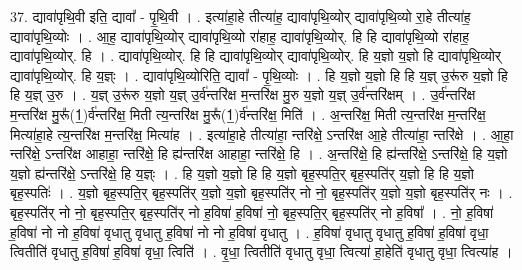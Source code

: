 \documentclass[17pt]{extarticle}
\begin{document}
37. द्यावा॑पृथि॒वी इति॒ द्यावा᳚ - पृ॒थि॒वी । . इत्या॑हा॒हे तीत्या॑ह॒ द्यावा॑पृथि॒व्योर् द्यावा॑पृथि॒व्यो रा॒हे तीत्या॑ह॒ द्यावा॑पृथि॒व्योः । . आ॒ह॒ द्यावा॑पृथि॒व्योर् द्यावा॑पृथि॒व्यो रा॑हाह॒ द्यावा॑पृथि॒व्योर्. हि हि द्यावा॑पृथि॒व्यो रा॑हाह॒ द्यावा॑पृथि॒व्योर्. हि । . द्यावा॑पृथि॒व्योर्. हि हि द्यावा॑पृथि॒व्योर् द्यावा॑पृथि॒व्योर्. हि य॒ज्ञो य॒ज्ञो हि द्यावा॑पृथि॒व्योर् द्यावा॑पृथि॒व्योर्. हि य॒ज्ञ्ः । . द्यावा॑पृथि॒व्योरिति॒ द्यावा᳚ - पृ॒थि॒व्योः । . हि य॒ज्ञो य॒ज्ञो हि हि य॒ज्ञ् उ॒रू॑रु य॒ज्ञो हि हि य॒ज्ञ् उ॒रु । . य॒ज्ञ् उ॒रू॑रु य॒ज्ञो य॒ज्ञ् उ॒र्व॑न्तरि॑क्ष म॒न्तरि॑क्ष मु॒रु य॒ज्ञो य॒ज्ञ् उ॒र्व॑न्तरि॑क्षम् । . उ॒र्व॑न्तरि॑क्ष म॒न्तरि॑क्ष मु॒रू᳚(1॒)र्व॑न्तरि॑क्ष॒ मिती त्य॒न्तरि॑क्ष मु॒रू᳚(1॒)र्व॑न्तरि॑क्ष॒ मिति॑ । . अ॒न्तरि॑क्ष॒ मिती त्य॒न्तरि॑क्ष म॒न्तरि॑क्ष॒ मित्या॑हा॒हे त्य॒न्तरि॑क्ष म॒न्तरि॑क्ष॒ मित्या॑ह । . इत्या॑हा॒हे तीत्या॑हा॒ न्तरि॑क्षे॒ ऽन्तरि॑क्ष आ॒हे तीत्या॑हा॒ न्तरि॑क्षे । . आ॒हा॒ न्तरि॑क्षे॒ ऽन्तरि॑क्ष आहाहा॒ न्तरि॑क्षे॒ हि ह्य॑न्तरि॑क्ष आहाहा॒ न्तरि॑क्षे॒ हि । . अ॒न्तरि॑क्षे॒ हि ह्य॑न्तरि॑क्षे॒ ऽन्तरि॑क्षे॒ हि य॒ज्ञो य॒ज्ञो ह्य॑न्तरि॑क्षे॒ ऽन्तरि॑क्षे॒ हि य॒ज्ञ्ः । . हि य॒ज्ञो य॒ज्ञो हि हि य॒ज्ञो बृह॒स्पति॒र् बृह॒स्पति॑र् य॒ज्ञो हि हि य॒ज्ञो बृह॒स्पतिः॑ । . य॒ज्ञो बृह॒स्पति॒र् बृह॒स्पति॑र् य॒ज्ञो य॒ज्ञो बृह॒स्पति॑र् नो नो॒ बृह॒स्पति॑र् य॒ज्ञो य॒ज्ञो बृह॒स्पति॑र् नः । . बृह॒स्पति॑र् नो नो॒ बृह॒स्पति॒र् बृह॒स्पति॑र् नो ह॒विषा॑ ह॒विषा॑ नो॒ बृह॒स्पति॒र् बृह॒स्पति॑र् नो ह॒विषा᳚ । . नो॒ ह॒विषा॑ ह॒विषा॑ नो नो ह॒विषा॑ वृधातु वृधातु ह॒विषा॑ नो नो ह॒विषा॑ वृधातु । . ह॒विषा॑ वृधातु वृधातु ह॒विषा॑ ह॒विषा॑ वृधा॒ त्वितीति॑ वृधातु ह॒विषा॑ ह॒विषा॑ वृधा॒ त्विति॑ । . वृ॒धा॒ त्वितीति॑ वृधातु वृधा॒ त्वित्या॑ हा॒हेति॑ वृधातु वृधा॒ त्वित्या॑ह । \newline
\pagebreak
{}
\end{document}
